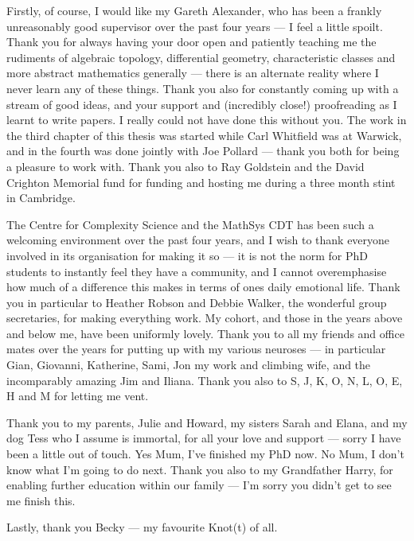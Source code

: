 Firstly, of course, I would like my Gareth Alexander, who has been a frankly unreasonably good supervisor over the past four years --- I feel a little spoilt. Thank you for always having your door open and patiently teaching me the rudiments of algebraic topology, differential geometry, characteristic classes and more abstract mathematics generally --- there is an alternate reality where I never learn any of these things. Thank you also for constantly coming up with a stream of good ideas, and your support and (incredibly close!) proofreading as I learnt to write papers. I really could not have done this without you. The work in the third chapter of this thesis was started while Carl Whitfield was at Warwick, and in the fourth was done jointly with Joe Pollard --- thank you both for being a pleasure to work with. Thank you also to Ray Goldstein and the David Crighton Memorial fund for funding and hosting me during a three month stint in Cambridge.  

The Centre for Complexity Science and the MathSys CDT has been such a welcoming environment over the past four years, and I wish to thank everyone involved in its organisation for making it so --- it is not the norm for PhD students to instantly feel they have a community, and I cannot overemphasise how much of a difference this makes in terms of ones daily emotional life. Thank you in particular to Heather Robson and Debbie Walker, the wonderful group secretaries, for making everything work.  My cohort, and those in the years above and below me, have been uniformly lovely. Thank you to all my friends and office mates over the years for putting up with my various neuroses --- in particular Gian, Giovanni, Katherine, Sami, Jon my work and climbing wife, and the incomparably amazing Jim and Iliana. Thank you also to S, J, K, O, N, L, O, E, H and M for letting me vent.

Thank you to my parents, Julie and Howard, my sisters Sarah and Elana, and my dog Tess who I assume is immortal, for all your love and support --- sorry I have been a little out of touch. Yes Mum, I've finished my PhD now. No Mum, I don't know what I'm going to do next. Thank you also to my Grandfather Harry, for enabling further education within our family --- I'm sorry you didn't get to see me finish this.

 Lastly, thank you Becky --- my favourite Knot(t) of all.

